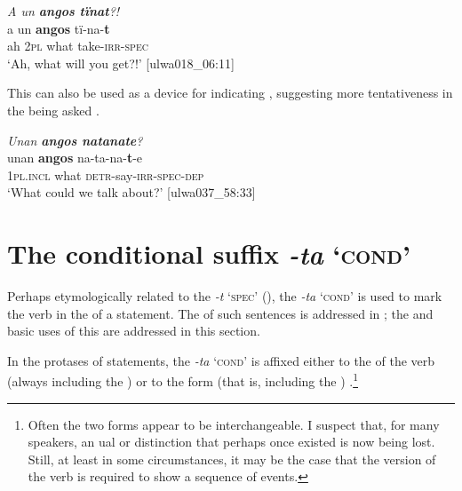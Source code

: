 \ea%
    \label{ex:verbs:87}
          \textit{A un \textbf{angos tïnat}?!}\\
\gll    a  un  \textbf{angos}  tï-na-\textbf{t}\\
    ah  2\textsc{pl}  what  take-\textsc{irr-spec}\\
\glt `Ah, what will you get?!’ [ulwa018\_06:11]
\z


This  can also be used as a device for indicating , suggesting more tentativeness in the  being asked .

\ea%
    \label{ex:verbs:88}
          \textit{Unan \textbf{angos natanate}?}\\
\gll unan     \textbf{angos}  na-ta-na-\textbf{t}{}-e\\
    1\textsc{pl.incl}  what  \textsc{detr-}say-\textsc{irr-spec-dep}\\
\glt `What could we talk about?’ [ulwa037\_58:33]
\z

\section{The conditional suffix \textit{-ta} ‘\textsc{cond}’}\label{sec:4.12}


Perhaps etymologically related to the   \textit{-t} ‘\textsc{spec}’ (), the   \textit{-ta} ‘\textsc{cond}’ is used to mark the verb in the  of a  statement. The  of such sentences is addressed in ; the  and basic uses of this  are addressed in this section.

  In the  protases of  statements, the  \textit{-ta} ‘\textsc{cond}’ is affixed either to the  of the verb (always including the )  or to the  form (that is, including the  ) .\footnote{Often the two forms appear to be interchangeable. I suspect that, for many speakers, an ual or  distinction that perhaps once existed is now being lost. Still, at least in some circumstances, it may be the case that the  version of the  verb is required to show a sequence of events.}

